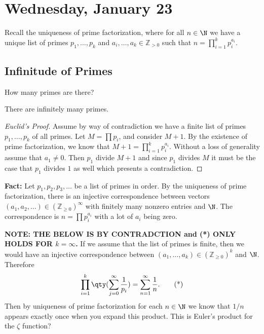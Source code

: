 
\section{Wednesday, January 23}

Recall the uniqueness of prime factorization, where for all $n \in \N$ we have a unique list of primes $p_1, \dotsc, p_k$ and $a_i, \dotsc, a_k \in \mathbb{Z}_{>0}$ such that $n = \prod_{i=1}^k p_i^{a_i}$.

\subsection{Infinitude of Primes}
\begin{problem}
How many primes are there?
\end{problem}

\begin{theorem}
There are infinitely many primes.
\end{theorem}

\begin{proof}[Euclid's Proof]
Assume by way of contradiction we have a finite list of primes $p_1, \dotsc, p_k$ of all primes. Let $M = \prod p_i$, and consider $M+1$. By the existence of prime factorization, we know that $M+1 = \prod_{i=1}^k p_i^{a_i}$. Without a loss of generality assume that $a_1 \not= 0$. Then $p_1$ divide $M+1$ and since $p_1$ divides $M$ it must be the case that $p_1$ divides $1$ as well which presents a contradiction.
\end{proof}

\textbf{Fact:} Let $p_1, p_2, p_3, \dotsc$ be a list of primes in order. By the uniqueness of prime factorization, there is an injective correspondence between vectors $(a_1, a_2, \dotsc) \in (\mathbb{Z}_{\geq0})^\infty$ with finitely many nonzero entries and $\N$. The correspondence is $n = \prod p_i^{a_i}$ with a lot of $a_i$ being zero.

\textbf{NOTE: THE BELOW IS BY CONTRADCTION and (*) ONLY HOLDS FOR $k=\infty$.}
If we assume that the list of primes is finite, then we would have an injective correspondence between $(a_1, \dotsc, a_k) \in (\mathbb{Z}_{\geq 0})^k$ and $\N$. Therefore
\[ \prod_{i=1}^k\qty(\sum_{j=0}^\infty \frac{1}{p_i}) = \sum_{n=1}^\infty \frac{1}{n}. \tag{*} \]
Then by uniqueness of prime factorization for each $n \in \N$ we know that $1/n$ appears exactly once when you expand this product. This is Euler's product for the $\zeta$ function?

